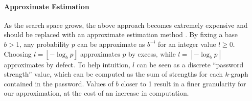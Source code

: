 \documentclass[a4paper,twocolumn]{article}
\begin{document}
\paragraph*{Approximate Estimation}

As the search space grows, the above approach becomes extremely expensive
and should be replaced with an approximate estimation method \cite{Narayanan2005Fast}.
By fixing a base $b>1$, any probability $p$ can be approximate as
$b^{-l}$ for an integer value $l\geq0$. Choosing $l=\left\lfloor -\log_{b}p\right\rfloor $
approximates $p$ by excess, while $l=\left\lceil -\log_{b}p\right\rceil $
approximates by defect. To help intuition, $l$ can be seen as a discrete
{}``password strength'' value, which can be computed as the sum
of strengths for each $k$-graph contained in the password. Values
of $b$ closer to 1 result in a finer granularity for our approximation,
at the cost of an increase in computation.
\end{document}
